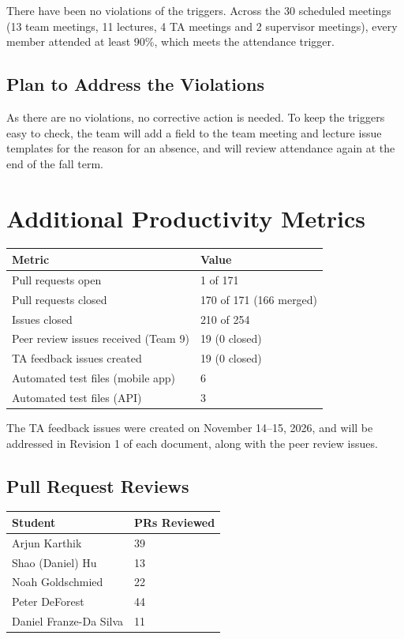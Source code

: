 \documentclass{article}
\begin{document}
There have been no violations of the triggers. Across the 30 scheduled
meetings (13 team meetings, 11 lectures, 4 TA meetings and 2 supervisor
meetings), every member attended at least 90\%, which meets the attendance
trigger.

\subsection*{Plan to Address the Violations}

As there are no violations, no corrective action is needed. To keep the
triggers easy to check, the team will add a field to the team meeting and
lecture issue templates for the reason for an absence, and will review
attendance again at the end of the fall term.

\section{Additional Productivity Metrics}

\begin{table}[H]
\centering
\begin{tabular}{ll}
\toprule
\textbf{Metric} & \textbf{Value}\\
\midrule
Pull requests open & 1 of 171\\
Pull requests closed & 170 of 171 (166 merged)\\
Issues closed & 210 of 254\\
Peer review issues received (Team 9) & 19 (0 closed)\\
TA feedback issues created & 19 (0 closed)\\
Automated test files (mobile app) & 6\\
Automated test files (API) & 3\\
\bottomrule
\end{tabular}
\end{table}

The TA feedback issues were created on November 14--15, 2026, and will be
addressed in Revision 1 of each document, along with the peer review issues.

\subsection*{Pull Request Reviews}

\begin{table}[H]
\centering
\begin{tabular}{ll}
\toprule
\textbf{Student} & \textbf{PRs Reviewed}\\
\midrule
Arjun Karthik & 39\\
Shao (Daniel) Hu & 13\\
Noah Goldschmied & 22\\
Peter DeForest & 44\\
Daniel Franze-Da Silva & 11\\
\bottomrule
\end{tabular}
\end{table}
\end{document}
